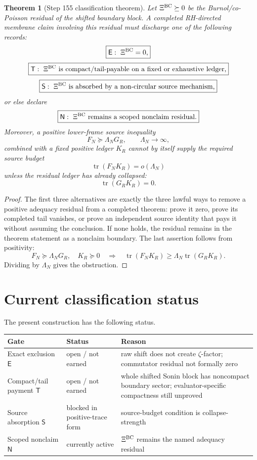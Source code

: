 \documentclass[11pt]{article}
\newtheorem{theorem}{Theorem}
\newcommand{\tr}{\operatorname{tr}}
\newcommand{\XiBC}{\Xi^{\rm BC}}
\begin{document}
\begin{theorem}[Step 155 classification theorem]
Let $\XiBC\succeq0$ be the Burnol/co-Poisson residual of the shifted boundary block.  A completed RH-directed membrane claim involving this residual must discharge one of the following records:
\[
  \boxed{\mathsf E:\ \XiBC=0,}
\]
\[
  \boxed{\mathsf T:\ \XiBC\text{ is compact/tail-payable on a fixed or exhaustive ledger,}}
\]
\[
  \boxed{\mathsf S:\ \XiBC\text{ is absorbed by a non-circular source mechanism,}}
\]
or else declare
\[
  \boxed{\mathsf N:\ \XiBC\text{ remains a scoped nonclaim residual.}}
\]
Moreover, a positive lower-frame source inequality
\[
  F_N\succeq\Lambda_NG_R,
  \qquad \Lambda_N\to\infty,
\]
combined with a fixed positive ledger $K_R$ cannot by itself supply the required source budget
\[
  \tr(F_NK_R)=o(\Lambda_N)
\]
unless the residual ledger has already collapsed:
\[
  \tr(G_RK_R)=0.
\]
\end{theorem}

\begin{proof}
The first three alternatives are exactly the three lawful ways to remove a positive adequacy residual from a completed theorem: prove it zero, prove its completed tail vanishes, or prove an independent source identity that pays it without assuming the conclusion.  If none holds, the residual remains in the theorem statement as a nonclaim boundary.  The last assertion follows from positivity:
\[
  F_N\succeq\Lambda_NG_R,
  \quad K_R\succeq0
  \quad\Rightarrow\quad
  \tr(F_NK_R)\ge\Lambda_N\tr(G_RK_R).
\]
Dividing by $\Lambda_N$ gives the obstruction.
\end{proof}

\section{Current classification status}
The present construction has the following status.

\begin{center}
\begin{tabular}{lll}
\toprule
Gate & Status & Reason \\
\midrule
Exact exclusion $\mathsf E$ & open / not earned & raw shift does not create $\zeta$-factor; commutator residual not formally zero \\
Compact/tail payment $\mathsf T$ & open / not earned & whole shifted Sonin block has noncompact boundary sector; evaluator-specific compactness still unproved \\
Source absorption $\mathsf S$ & blocked in positive-trace form & source-budget condition is collapse-strength \\
Scoped nonclaim $\mathsf N$ & currently active & $\XiBC$ remains the named adequacy residual \\
\bottomrule
\end{tabular}
\end{center}
\end{document}
